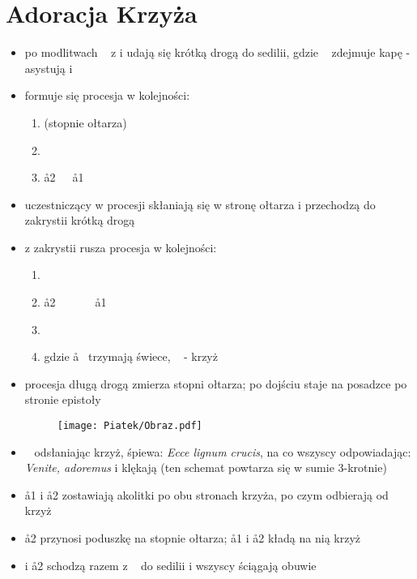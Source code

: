 \section{Adoracja Krzyża}
    
    \begin{itemize}
        \item po modlitwach \ii~ z  i  udają się krótką drogą do sedilii, gdzie \ii~ zdejmuje kapę - asystują  i 
        \item formuje się procesja w kolejności:

        \begin{enumerate}\centering
            \item[] (stopnie ołtarza)
            \item[] ~~~\ii~~~~
            \item[] \aa2~~~\aa1
        \end{enumerate}
    
        \item uczestniczący w procesji skłaniają się w stronę ołtarza i przechodzą do zakrystii krótką drogą
     
        \item z zakrystii rusza procesja w kolejności:
      
        \begin{enumerate}\centering
            \item[] ~~~
            \item[] \aa2~~~\ii~~~~\aa1 
            \item[] 
            \item[] gdzie \aa~ trzymają świece, \ii~ - krzyż
        \end{enumerate}
    
        \item procesja długą drogą zmierza stopni ołtarza; po dojściu staje na posadzce po stronie epistoły
     
        \begin{figure}[h]
            \centering
            \texttt{[image: Piatek/Obraz.pdf]}
        \end{figure}
     
        \item \ii~ odsłaniając krzyż, śpiewa: \textit{Ecce lignum crucis}, na co wszyscy odpowiadając: \textit{Venite, adoremus} i klękają (ten schemat powtarza się w sumie 3-krotnie)
        \item \aa1 i \aa2 zostawiają akolitki po obu stronach krzyża, po czym odbierają od \ii~ krzyż
        \item \aa2 przynosi poduszkę na stopnie ołtarza; \aa1 i \aa2 kładą na nią krzyż
        \item {} i \aa2 schodzą razem z \ii~ do sedilii i wszyscy ściągają obuwie
      

\end{itemize}
